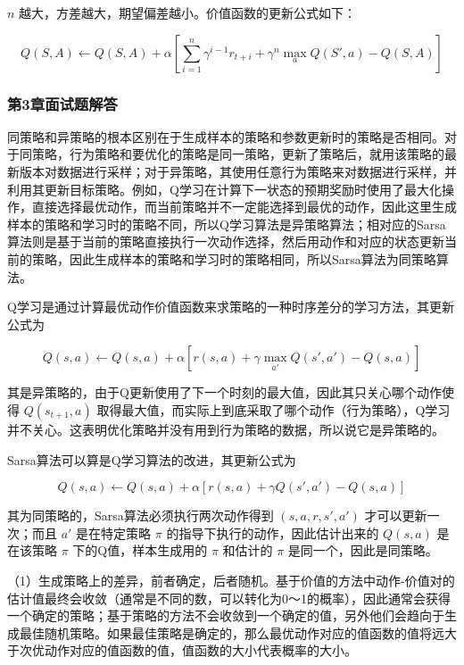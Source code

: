 $n$ 越大，方差越大，期望偏差越小。价值函数的更新公式如下：

$$
Q\left(S, A\right) \leftarrow Q\left(S, A\right)+\alpha\left[\sum_{i=1}^{n} \gamma^{i-1} r_{t+i}+\gamma^{n} \max _{a}   Q\left(S',a\right)-Q\left(S, A\right)\right]
$$



\subsubsection*{第3章面试题解答}


同策略和异策略的根本区别在于生成样本的策略和参数更新时的策略是否相同。对于同策略，行为策略和要优化的策略是同一策略，更新了策略后，就用该策略的最新版本对数据进行采样；对于异策略，其使用任意行为策略来对数据进行采样，并利用其更新目标策略。例如，Q学习在计算下一状态的预期奖励时使用了最大化操作，直接选择最优动作，而当前策略并不一定能选择到最优的动作，因此这里生成样本的策略和学习时的策略不同，所以Q学习算法是异策略算法；相对应的Sarsa算法则是基于当前的策略直接执行一次动作选择，然后用动作和对应的状态更新当前的策略，因此生成样本的策略和学习时的策略相同，所以Sarsa算法为同策略算法。


Q学习是通过计算最优动作价值函数来求策略的一种时序差分的学习方法，其更新公式为

$$
Q(s, a) \leftarrow Q(s, a) + \alpha [r(s,a) + \gamma \max_{a'} Q(s', a') - Q(s, a)]
$$

\noindent 其是异策略的，由于Q更新使用了下一个时刻的最大值，因此其只关心哪个动作使得 $Q(s_{t+1}, a)$ 取得最大值，而实际上到底采取了哪个动作（行为策略），Q学习并不关心。这表明优化策略并没有用到行为策略的数据，所以说它是异策略的。


Sarsa算法可以算是Q学习算法的改进，其更新公式为

$$
Q(s, a) \leftarrow Q(s, a) + \alpha [r(s,a) + \gamma  Q(s', a') - Q(s, a)]
$$

\noindent 其为同策略的，Sarsa算法必须执行两次动作得到 $(s,a,r,s',a')$ 才可以更新一次；而且 $a'$ 是在特定策略 $\pi$ 的指导下执行的动作，因此估计出来的 $Q(s,a)$ 是在该策略 $\pi$ 下的Q值，样本生成用的 $\pi$ 和估计的 $\pi$ 是同一个，因此是同策略。

	
（1）生成策略上的差异，前者确定，后者随机。基于价值的方法中动作-价值对的估计值最终会收敛（通常是不同的数，可以转化为0～1的概率），因此通常会获得一个确定的策略；基于策略的方法不会收敛到一个确定的值，另外他们会趋向于生成最佳随机策略。如果最佳策略是确定的，那么最优动作对应的值函数的值将远大于次优动作对应的值函数的值，值函数的大小代表概率的大小。

